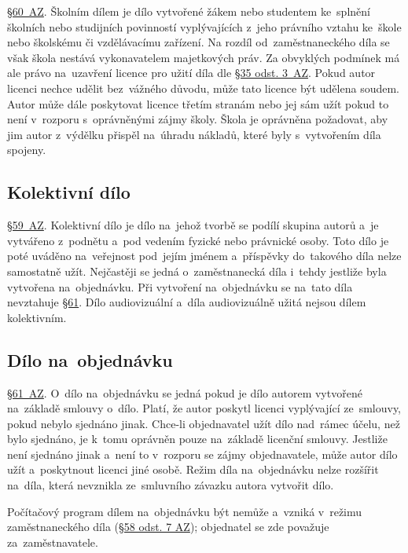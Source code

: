 \href{https://www.zakonyprolidi.cz/cs/2000-121#p60}{§60~AZ}. Školním dílem je dílo vytvořené žákem nebo studentem ke~splnění školních nebo studijních povinností vyplývajících z~jeho právního vztahu ke~škole nebo školskému či vzdělávacímu zařízení. Na rozdíl od~zaměstnaneckého díla se však škola nestává vykonavatelem majetkových práv. Za obvyklých podmínek má ale právo na~uzavření licence pro užití díla dle \href{https://www.zakonyprolidi.cz/cs/2000-121#p35-3}{§35 odst. 3~AZ}. Pokud autor licenci nechce udělit bez~vážného důvodu, může tato licence být udělena soudem. Autor může dále poskytovat licence třetím stranám nebo jej sám užít pokud to není v~rozporu s~oprávněnými zájmy školy. Škola je oprávněna požadovat, aby jim autor z~výdělku přispěl na~úhradu nákladů, které byly s~vytvořením díla spojeny.

\subsection{Kolektivní dílo}

\href{https://www.zakonyprolidi.cz/cs/2000-121#p59}{§59~AZ}. Kolektivní dílo je dílo na~jehož tvorbě se podílí skupina autorů a~je vytvářeno z~podnětu a~pod vedením fyzické nebo právnické osoby. Toto dílo je poté uváděno na~veřejnost pod~jejím jménem a~příspěvky do~takového díla nelze samostatně užít. Nejčastěji se jedná o~zaměstnanecká díla i~tehdy jestliže byla vytvořena na~objednávku. Při vytvoření na~objednávku se na~tato díla nevztahuje \href{https://www.zakonyprolidi.cz/cs/2000-121#p61}{§61}. Dílo audiovizuální a~díla audiovizuálně užitá nejsou dílem kolektivním.

\subsection{Dílo na~objednávku}

\href{https://www.zakonyprolidi.cz/cs/2000-121#p61}{§61~AZ}. O~dílo na~objednávku se jedná pokud je dílo autorem vytvořené na~základě smlouvy o~dílo. Platí, že autor poskytl licenci vyplývající ze~smlouvy, pokud nebylo sjednáno jinak. Chce-li objednavatel užít dílo nad~rámec účelu, než bylo sjednáno, je k~tomu oprávněn pouze na~základě licenční smlouvy. Jestliže není sjednáno jinak a~není to v~rozporu se zájmy objednavatele, může autor dílo užít a~poskytnout licenci jiné osobě. Režim díla na~objednávku nelze rozšířit na~díla, která nevznikla ze~smluvního závazku autora vytvořit dílo.

Počítačový program dílem na~objednávku být nemůže a~vzniká v~režimu zaměstnaneckého díla (\href{https://www.zakonyprolidi.cz/cs/2000-121#p58}{§58 odst. 7 AZ}); objednatel se zde považuje za~zaměstnavatele.

